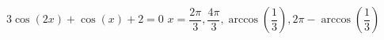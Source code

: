 { $3\cos(2x) + \cos(x) + 2 = 0$}
{ $x = \dfrac{2\pi}{3}, \dfrac{4\pi}{3}, \arccos\left(\dfrac{1}{3}\right), 2\pi -\arccos\left(\dfrac{1}{3}\right) $}
